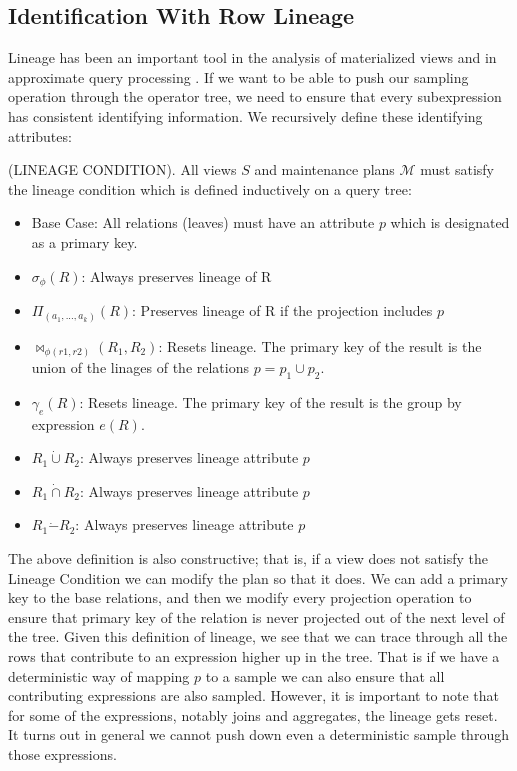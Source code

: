 \subsection{Identification With Row Lineage}
Lineage has been an important tool in the analysis of materialized views \cite{DBLP:journals/vldb/CuiW03} and in approximate query processing \cite{DBLP:conf/sigmod/ZengGMZ14}.
If we want to be able to push our sampling operation through the operator tree, we need to ensure that every subexpression has consistent identifying information.
We recursively define these identifying attributes:
\begin{definition}
(LINEAGE CONDITION). All views $S$ and maintenance plans $\mathcal{M}$ must satisfy the lineage condition which is defined inductively on a query tree:
\begin{itemize}\vspace{-.45em}
\item Base Case: All relations (leaves) must have an attribute $p$ which is designated as a primary key.\vspace{-.45em}
\item $\sigma_{\phi}(R)$: Always preserves lineage of R \vspace{-.45em}
\item $\Pi_{(a_1,...,a_k)}(R)$: Preserves lineage of R if the projection includes $p$ \vspace{-.45em}
\item $\bowtie_{\phi (r1,r2)}(R_1,R_2)$: Resets lineage. The primary key of the result is the union of the linages of the relations $p= p_1 \cup p_2$. 
\item $\gamma_{e}(R)$: Resets lineage. The primary key of the result is the group by expression $e(R)$.\vspace{-.45em}
\item $R_1 \dot{\cup} R_2$: Always preserves lineage attribute $p$
\item $R_1 \dot{\cap} R_2$: Always preserves lineage attribute $p$
\item $R_1 \dot{-} R_2$: Always preserves lineage attribute $p$
\end{itemize}
\end{definition}
The above definition is also constructive; that is, if a view does not satisfy the Lineage Condition we can modify the plan so that it does.
We can add a primary key to the base relations, and then we modify every projection operation to ensure that primary key of the relation is never projected out of the next level of the tree.
Given this definition of lineage, we see that we can trace through all the rows that contribute to an expression higher up in the tree.
That is if we have a deterministic way of mapping $p$ to a sample we can also ensure that all contributing expressions are also sampled. 
However, it is important to note that for some of the expressions, notably joins and aggregates, the lineage gets reset.
It turns out in general we cannot push down even a deterministic sample through those expressions.

